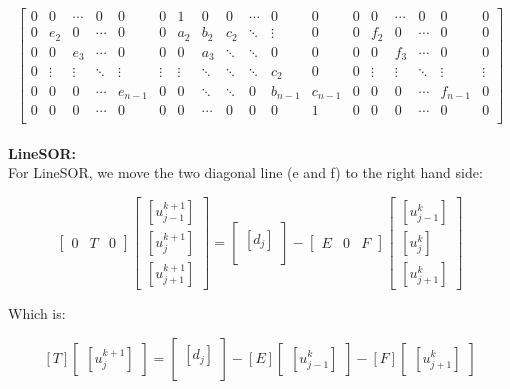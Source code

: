 \documentclass[12pt]{article}
\begin{document}
\[
\left[
\begin{array}{cccccc|cccccc|cccccc}
0 & 0 & \cdots & 0 & 0 & 0 & 1 & 0 & 0 & \cdots & 0 & 0 & 0 & 0 & \cdots & 0 & 0 & 0 \\
0 & e_{2} & 0 & \cdots & 0 & 0 & a_{2} & b_{2} & c_{2} & \ddots & \vdots & 0 & 0 & f_{2} & 0 & \cdots & 0 & 0 \\
0 & 0 & e_{3} & \cdots & 0 & 0 & 0 & a_{3} & \ddots & \ddots & 0 & 0 & 0 & 0 & f_{3} & \cdots & 0 & 0 \\
0 & \vdots & \vdots & \ddots & \vdots & \vdots & \vdots & \ddots & \ddots & \ddots & c_{2} & 0 & 0 & \vdots & \vdots & \ddots & \vdots & \vdots \\
0 & 0 & 0 & \cdots & e_{n-1} & 0 & 0 & \ddots & \ddots & 0 & b_{n-1} & c_{n-1} & 0 & 0 & 0 & \cdots & f_{n-1} & 0 \\
0 & 0 & 0 & \cdots & 0 & 0 & 0 & \cdots & 0 & 0 & 0 & 1 & 0 & 0 & 0 & \cdots & 0 & 0 \\
\end{array}
\right]
\]\\

\textbf{LineSOR:}\\

For LineSOR, we move the two diagonal line (e and f) to the right hand side:

\[
\left[
\begin{array}{c|c|c}
0 & T & 0 
\end{array}
\right]
\begin{bmatrix}
    [u_{j-1}^{k+1}] \\
    [u_{j}^{k+1}] \\
   [ u_{j+1}^{k+1}]
\end{bmatrix}
=
\begin{bmatrix}
    [d_{j}] \\
\end{bmatrix}
-
\left[
\begin{array}{c|c|c}
E & 0 & F 
\end{array}
\right]
\begin{bmatrix}
    [u_{j-1}^{k}] \\
    [u_{j}^{k}] \\
   [ u_{j+1}^{k}]
\end{bmatrix}
\]


Which is:

\[
\left[
T
\right]
\begin{bmatrix}
    [u_{j}^{k+1}]
\end{bmatrix}
=
\begin{bmatrix}
    [d_{j}] \\
\end{bmatrix}
-
\left[
E
\right]
\begin{bmatrix}
    [u_{j-1}^{k}]
\end{bmatrix}
-
\left[
F
\right]
\begin{bmatrix}
    [u_{j+1}^{k}]
\end{bmatrix}
\]
\end{document}
